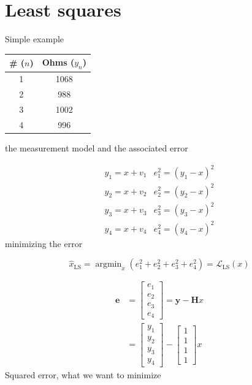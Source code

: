 \documentclass{article}
\begin{document}
\section*{Least squares}
Simple example
\begin{table}[!h]
\centering
\begin{tabular}{| c | c |}
\hline
\#  ($n$) & Ohms  ($y_n$) \\
\hline
1         & 1068        \\
2         & 988        \\
3         & 1002        \\
4         & 996        \\
\hline
\end{tabular}
\end{table}

the measurement model and the associated error

\begin{equation}
\begin{array}{ll}
{y_{1}=x+v_{1}} & {e_{1}^{2}=\left(y_{1}-x\right)^{2}} \\
 {y_{2}=x+v_{2}} & {e_{2}^{2}=\left(y_{2}-x\right)^{2}} \\
 {y_{3}=x+v_{3}} & {e_{3}^{2}=\left(y_{3}-x\right)^{2}} \\
 {y_{4}=x+v_{4}} & {e_{4}^{2}=\left(y_{4}-x\right)^{2}}
\end{array}
\end{equation}
minimizing the error

\begin{equation}
\hat{x}_{\mathrm{LS}}=\operatorname{argmin}_{x}\left(e_{1}^{2}+e_{2}^{2}+e_{3}^{2}+e_{4}^{2}\right)=\mathscr{L}_{\mathrm{LS}}(x)
\end{equation}

\begin{equation}
\begin{aligned} 
\mathbf{e} &= \left[\begin{array}{l}{e_{1}} \\ {e_{2}} \\ {e_{3}} \\ {e_{4}}\end{array}\right]  =\mathbf{y}-\mathbf{H} x \\
&=\left[\begin{array}{l}{y_{1}} \\ {y_{2}} \\ {y_{3}} \\ {y_{4}}\end{array}\right]-\left[\begin{array}{l}{1} \\ {1} \\ {1} \\ {1}\end{array}\right] x 
\end{aligned}
\end{equation}
Squared error, what we want to minimize
\end{document}
